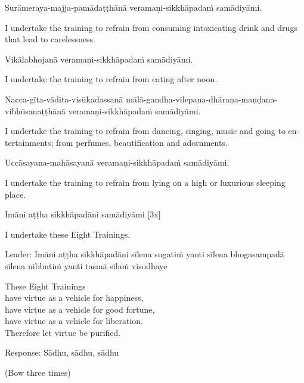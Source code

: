 Surāmeraya-majja-pamādaṭṭhānā veramaṇi-sikkhāpadaṁ samādiyāmi.\\

\begin{english}
  I undertake the training to refrain from consuming intoxicating drink and drugs that
  lead to carelessness.\\
\end{english}

Vikālabhojanā veramaṇi-sikkhāpadaṁ samādiyāmi.\\

\begin{english}
  I undertake the training to refrain from eating after noon.
\\
  \end{english}

Nacca-gīta-vādita-visūkadassanā mālā-gandha-vilepana-dhāraṇa-maṇḍana-vibhūsanaṭṭhānā veramaṇi-sikkhāpadaṁ samādiyāmi.\\

\begin{english}
  I undertake the training to refrain from dancing, singing, music and going to entertainments; from perfumes, beautification and adornments.\\
  \end{english}

Uccāsayana-mahāsayanā veramaṇi-sikkhāpadaṁ samādiyāmi.\\

\begin{english}
  I undertake the training to refrain from lying on a high or luxurious sleeping place.\\
\end{english}

Imāni aṭṭha sikkhāpadāni samādiyāmi \hfill{[3x]}\\

\begin{english}
  I undertake these Eight Trainings.\\
\end{english}

Leader: Imāni aṭṭha sikkhāpadāni sīlena sugatiṁ yanti sīlena bhogasampadā sīlena nibbutiṁ yanti tasmā sīlaṁ visodhaye\\

\begin{english}
  These Eight Trainings\\
  have virtue as a vehicle for happiness,\\
  have virtue as a vehicle for good fortune,\\
  have virtue as a vehicle for liberation.\\
  Therefore let virtue be purified.\\
  \end{english}

Response: Sādhu, sādhu, sādhu\\

\begin{center}
  (Bow three times)\\
\end{center}
